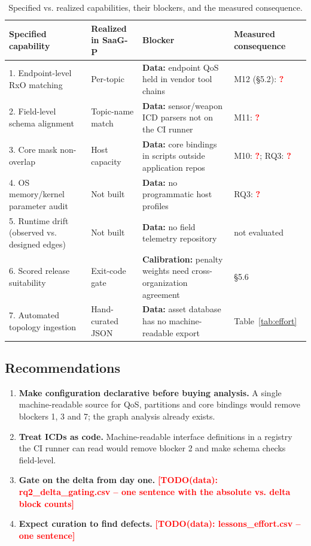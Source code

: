\documentclass[sigconf,screen]{acmart}
\newcommand{\TODOdata}[1]{\textcolor{red}{\textbf{[TODO(data): #1]}}}
\newcommand{\tbd}{\textcolor{red}{\textbf{?}}}
\begin{document}
\begin{table}[t]
\centering
\caption{Specified vs. realized capabilities, their blockers, and the measured consequence.}
\label{tab:gap}
\footnotesize
\begin{tabularx}{\textwidth}{l l Y Y}
\toprule
Specified capability & Realized in SaaG-P & Blocker & Measured consequence \\
. Endpoint-level RxO matching & Per-topic & \textbf{Data:} endpoint QoS held in vendor tool chains & M12 (\S5.2): \tbd \\
2. Field-level schema alignment & Topic-name match & \textbf{Data:} sensor/weapon ICD parsers not on the CI runner & M11: \tbd \\
3. Core mask non-overlap & Host capacity & \textbf{Data:} core bindings in scripts outside application repos & M10: \tbd; RQ3: \tbd \\
4. OS memory/kernel parameter audit & Not built & \textbf{Data:} no programmatic host profiles & RQ3: \tbd \\
5. Runtime drift (observed vs. designed edges) & Not built & \textbf{Data:} no field telemetry repository & not evaluated \\
6. Scored release suitability & Exit-code gate & \textbf{Calibration:} penalty weights need cross-organization agreement & \S5.6 \\
7. Automated topology ingestion & Hand-curated JSON & \textbf{Data:} asset database has no machine-readable export & Table~\ref{tab:effort} \\
\bottomrule
\end{tabularx}
\end{table}

\subsection{Recommendations}
\begin{enumerate}
\item \textbf{Make configuration declarative before buying analysis.} A single machine-readable source for QoS, partitions and core bindings would remove blockers 1, 3 and 7; the graph analysis already exists.
\item \textbf{Treat ICDs as code.} Machine-readable interface definitions in a registry the CI runner can read would remove blocker 2 and make schema checks field-level.
\item \textbf{Gate on the delta from day one.} \TODOdata{rq2\_delta\_gating.csv -- one sentence with the absolute vs. delta block counts}
\item \textbf{Expect curation to find defects.} \TODOdata{lessons\_effort.csv -- one sentence}
\end{enumerate}
\end{document}

